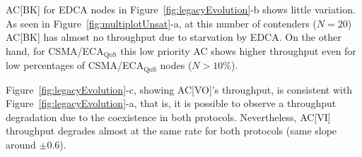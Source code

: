 AC[BK] for EDCA nodes in Figure~\ref{fig:legacyEvolution}-b shows little variation. As seen in Figure~\ref{fig:multiplotUnsat}-a, at this number of contenders ($N=20$) AC[BK] has almost no throughput due to starvation by EDCA. On the other hand, for CSMA/ECA$_{\text{QoS}}$ this low priority AC shows higher throughput even for low percentages of CSMA/ECA$_{\text{QoS}}$ nodes ($N>10\%$).

Figure~\ref{fig:legacyEvolution}-c, showing AC[VO]'s throughput, is consistent with Figure~\ref{fig:legacyEvolution}-a, that is, it is possible to observe a throughput degradation due to the coexistence in both protocols. Nevertheless, AC[VI] throughput degrades almost at the same rate for both protocols (same slope around $\pm 0.6$).

